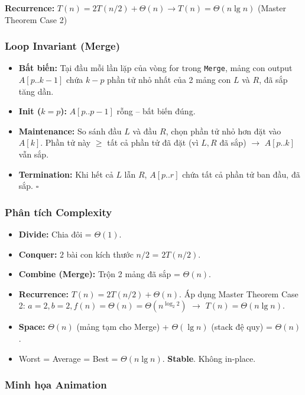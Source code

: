 \documentclass[10pt]{article}
\providecommand{\tightlist}{\setlength{\itemsep}{0pt}\setlength{\parskip}{0pt}}
\begin{document}
\textbf{Recurrence:}
\(T(n) = 2T(n/2) + \Theta(n) \to T(n) = \Theta(n \lg n)\) (Master
Theorem Case 2)

\subsubsection{Loop Invariant (Merge)}
\begin{itemize}
\tightlist
\item \textbf{Bất biến:} Tại đầu mỗi lần lặp của vòng for trong \texttt{Merge}, mảng con output $A[p..k{-}1]$ chứa $k{-}p$ phần tử nhỏ nhất của 2 mảng con $L$ và $R$, đã sắp tăng dần.
\item \textbf{Init ($k=p$):} $A[p..p{-}1]$ rỗng -- bất biến đúng.
\item \textbf{Maintenance:} So sánh đầu $L$ và đầu $R$, chọn phần tử nhỏ hơn đặt vào $A[k]$. Phần tử này $\geq$ tất cả phần tử đã đặt (vì $L, R$ đã sắp) $\to$ $A[p..k]$ vẫn sắp.
\item \textbf{Termination:} Khi hết cả $L$ lẫn $R$, $A[p..r]$ chứa tất cả phần tử ban đầu, đã sắp. $\square$
\end{itemize}

\subsubsection{Phân tích Complexity}
\begin{itemize}
\tightlist
\item \textbf{Divide:} Chia đôi = $\Theta(1)$.
\item \textbf{Conquer:} $2$ bài con kích thước $n/2$ = $2T(n/2)$.
\item \textbf{Combine (Merge):} Trộn 2 mảng đã sắp = $\Theta(n)$.
\item \textbf{Recurrence:} $T(n) = 2T(n/2) + \Theta(n)$. Áp dụng Master Theorem Case 2: $a=2, b=2, f(n)=\Theta(n)=\Theta(n^{\log_2 2})$ $\to$ $T(n) = \Theta(n \lg n)$.
\item \textbf{Space:} $\Theta(n)$ (mảng tạm cho Merge) + $\Theta(\lg n)$ (stack đệ quy) = $\Theta(n)$.
\item Worst = Average = Best = $\Theta(n \lg n)$. \textbf{Stable}. Không in-place.
\end{itemize}

\subsubsection{Minh họa Animation}
\end{document}
